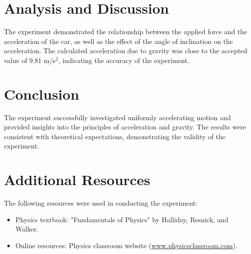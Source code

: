 \documentclass[twocolumn]{article}
\begin{document}
\section{Analysis and Discussion}
The experiment demonstrated the relationship between the applied force and the acceleration of the car, as well as the effect of the angle of inclination on the acceleration. The calculated acceleration due to gravity was close to the accepted value of \(9.81\) m/s\(^2\), indicating the accuracy of the experiment.

\section{Conclusion}
The experiment successfully investigated uniformly accelerating motion and provided insights into the principles of acceleration and gravity. The results were consistent with theoretical expectations, demonstrating the validity of the experiment.

\section{Additional Resources}
The following resources were used in conducting the experiment:
\begin{itemize}
    \item Physics textbook: "Fundamentals of Physics" by Halliday, Resnick, and Walker.
    \item Online resources: Physics classroom website (\url{www.physicsclassroom.com}).
\end{itemize}
\end{document}
